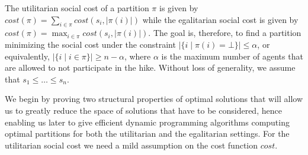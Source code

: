 \documentclass[a4paper,UKenglish,cleveref, autoref, thm-restate]{lipics-v2021}
\newcommand{\set}[1]{\{#1\}}
\newcommand{\modulus}[1]{\vert #1 \vert}
\newcommand{\cost}{\mathit{cost}}
\begin{document}
The utilitarian social cost of a partition $\pi$ is given by $\cost(\pi) = \sum_{i\in\pi}\cost(s_i,\modulus{\pi(i)})$ while the egalitarian social cost is given by $\cost(\pi) = \max_{i\in \pi}\cost(s_i,\modulus{\pi(i)})$. The goal is, therefore, to find a partition minimizing the social cost under the constraint $\modulus{\set{i \mid \pi(i)=\bot}} \leq \alpha$, or equivalently, $\modulus{\set{i \mid i\in\pi}} \geq n-\alpha$, where $\alpha$ is the maximum number of agents that are allowed to not participate in the hike. Without loss of generality, we assume that $s_1 \leq \ldots \leq s_n.$

We begin by proving two structural properties of optimal solutions that will allow us to greatly reduce the space of solutions that have to be considered, hence enabling us later to give efficient dynamic programming algorithms computing optimal partitions for both the utilitarian and the egalitarian settings. For the utilitarian social cost we need a mild assumption on the cost function $\cost$.
\end{document}
